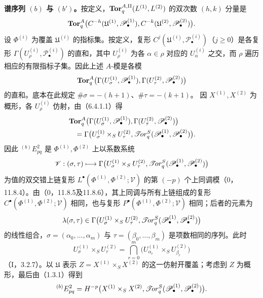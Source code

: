\textbf{谱序列 $(b)$ 与 $(b')$。}按定义，$\operatorname{\mathbf{Tor}}^{A,\mathrm{II}}_q(L^{(1)},L^{(2)})$ 的双次数 $(h,k)$ 分量是
\[
 \operatorname{\mathbf{Tor}}^A_q\bigl(C^{-h}(\mathfrak U^{(1)},\mathscr P^{(1)}_\bullet),
                  C^{-k}(\mathfrak U^{(2)},\mathscr P^{(2)}_\bullet)\bigr).
\]
设 $\Phi^{(i)}$ 为覆盖 $\mathfrak U^{(i)}$ 的指标集。按定义，复形
$C^j(\mathfrak U^{(i)},\mathscr P^{(i)}_\bullet)$（$j\geq0$）是各复形
$\Gamma(U^{(i)}_\rho,\mathscr P^{(i)}_\bullet)$ 的直和，其中
$U^{(i)}_\rho$ 为各 $\alpha\in\rho$ 对应的 $U^{(i)}_\alpha$ 之交，而 $\rho$ 遍历相应的有限指标子集。因此上述 $A$-模是各模
\[
 \operatorname{\mathbf{Tor}}^A_q\bigl(\Gamma(U^{(1)}_\sigma,\mathscr P^{(1)}_\bullet),
                  \Gamma(U^{(2)}_\tau,\mathscr P^{(2)}_\bullet)\bigr)
\]
的直和。底本在此规定
$\#\sigma=-(h+1)$、$\#\tau=-(k+1)$。
因 $X^{(1)},X^{(2)}$ 为概形，各 $U^{(i)}_\rho$ 仿射，由（6.4.1.1）得
\begin{align*}
 &\operatorname{\mathbf{Tor}}^A_q\bigl(\Gamma(U^{(1)}_\sigma,\mathscr P^{(1)}_\bullet),
                  \Gamma(U^{(2)}_\tau,\mathscr P^{(2)}_\bullet)\bigr)\\
 &\hspace{1em}=\Gamma\bigl(U^{(1)}_\sigma\times_SU^{(2)}_\tau,
                  \mathscr{T}\!or^S_q(\mathscr P^{(1)}_\bullet,\mathscr P^{(2)}_\bullet)\bigr).
\end{align*}
因此 ${}^{(b)}E^2_{pq}$ 是 $\Phi^{(1)},\Phi^{(2)}$ 上以系数系统
\[
 \mathscr V:(\sigma,\tau)\longmapsto
 \Gamma\bigl(U^{(1)}_\sigma\times_SU^{(2)}_\tau,
                  \mathscr{T}\!or^S_q(\mathscr P^{(1)}_\bullet,\mathscr P^{(2)}_\bullet)\bigr)
\]
为值的双交错上链复形 $L^\bullet(\Phi^{(1)},\Phi^{(2)};\mathscr V)$ 的第 $(-p)$ 个上同调模（0，11.8.4）。由（0，11.8.5及11.8.6），其上同调与所有上链组成的复形 $C^\bullet(\Phi^{(1)},\Phi^{(2)};\mathscr V)$ 相同，也与复形 $P^\bullet(\Phi^{(1)},\Phi^{(2)};\mathscr V)$ 相同；后者的元素为
\[
 \lambda(\sigma,\tau)\in
 \Gamma\bigl(U^{(1)}_\sigma\times_SU^{(2)}_\tau,
                  \mathscr{T}\!or^S_q(\mathscr P^{(1)}_\bullet,\mathscr P^{(2)}_\bullet)\bigr)
\]
的线性组合，$\sigma=(\alpha_0,\ldots,\alpha_m)$ 与
$\tau=(\beta_0,\ldots,\beta_m)$ 是项数相同的序列。此时
\[
 U^{(1)}_\sigma\times_SU^{(2)}_\tau
 =\bigcap_{r=0}^m\bigl(U^{(1)}_{\alpha_r}\times_SU^{(2)}_{\beta_r}\bigr)
\]
（I，3.2.7）。以 $\mathfrak U$ 表示 $Z=X^{(1)}\times_SX^{(2)}$ 的这一仿射开覆盖；考虑到 $Z$ 为概形，最后由（1.3.1）得到
\[
 {}^{(b)}E^2_{pq}=H^{-p}\bigl(X^{(1)}\times_SX^{(2)},
               \mathscr{T}\!or^S_q(\mathscr P^{(1)}_\bullet,\mathscr P^{(2)}_\bullet)\bigr).
\]

